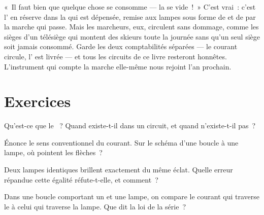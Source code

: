 \begin{remark}\label{rem:g7:circuits-series-parallel:whyhard}
«~Il faut bien que quelque chose se consomme --- la  se vide~!~»
C'est vrai~: c'est l'\emph{} en réserve dans la  qui est
dépensée, remise aux lampes sous forme de  et de  par
la marche qui passe. Mais les marcheurs, eux, circulent sans dommage,
comme les sièges d'un télésiège qui montent des skieurs toute la
journée sans qu'un seul siège soit jamais consommé. Garde les deux
comptabilités séparées --- le courant circule, l' est livrée
--- et tous les circuits de ce livre resteront honnêtes.
L'instrument qui compte la marche elle-même nous rejoint l'an
prochain.
\end{remark}

\section{Exercices}

\begin{exercise}[$\star$]\label{exo:g7:circuits-series-parallel:1}
Qu'est-ce que le ~? Quand existe-t-il dans un
circuit, et quand n'existe-t-il pas~?
\end{exercise}

\begin{exercise}[$\star$]\label{exo:g7:circuits-series-parallel:2}
Énonce le sens conventionnel du courant. Sur le schéma d'une boucle à
une lampe, où pointent les flèches~?
\end{exercise}

\begin{exercise}[$\star$]\label{exo:g7:circuits-series-parallel:3}
Deux lampes identiques  brillent exactement du même éclat.
Quelle erreur répandue cette égalité réfute-t-elle, et comment~?
\end{exercise}

\begin{exercise}[$\star$]\label{exo:g7:circuits-series-parallel:4}
Dans une boucle  comportant un  et une lampe, on
compare le courant qui traverse le  à celui qui traverse la
lampe. Que dit la loi de la série~?
\end{exercise}

